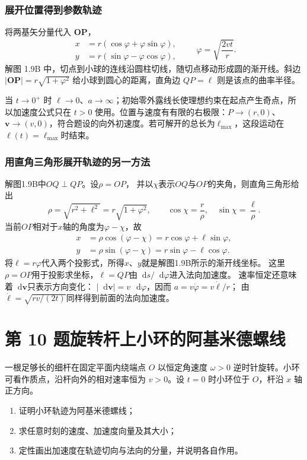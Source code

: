 \documentclass[UTF8,fontset=fandol,a4paper,11pt]{ctexart}
\newcommand{\dd}{\mathop{}\!\mathrm{d}}
\newcommand{\vect}[1]{\bm{#1}}
\newcommand{\tagline}[1]{\noindent{\small\color{muted}#1}\par}
\begin{document}
\subsubsection*{展开位置得到参数轨迹}
将两基矢分量代入 $\vect{OP}$，
\[
\boxed{\begin{aligned}
x&=r(\cos\varphi+\varphi\sin\varphi),\\
y&=r(\sin\varphi-\varphi\cos\varphi),
\end{aligned}\qquad\varphi=\sqrt{\frac{2vt}{r}}}.
\]
解图 1.9B 中，切点到小球的连线沿圆柱切线，随切点移动形成圆的渐开线。斜边 $|\vect{OP}|=r\sqrt{1+\varphi^2}$ 给小球到圆心的距离，直角边 $QP=\ell$ 则是该点的曲率半径。

当 $t\to0^+$ 时 $\ell\to0$、$a\to\infty$；初始零外露线长使理想约束在起点产生奇点，所以加速度公式只在 $t>0$ 使用。位置与速度有有限的右极限：$P\to(r,0)$、$\vect v\to(v,0)$，符合题设的向外初速度。若可解开的总长为$\ell_{\max}$，这段运动在$\ell(t)=\ell_{\max}$时结束。
\subsubsection*{用直角三角形展开轨迹的另一方法}
解图1.9B中$OQ\perp QP$。设$\rho=OP$，
并以$\chi$表示$OQ$与$OP$的夹角，则直角三角形给出
\[
\rho=\sqrt{r^2+\ell^2}=r\sqrt{1+\varphi^2},\qquad
\cos\chi=\frac r\rho,\quad \sin\chi=\frac{\ell}{\rho}.
\]
当前$OP$相对于$x$轴的角度为$\varphi-\chi$，故
\[
\begin{aligned}
x&=\rho\cos(\varphi-\chi)
=r\cos\varphi+\ell\sin\varphi,\\
y&=\rho\sin(\varphi-\chi)
=r\sin\varphi-\ell\cos\varphi.
\end{aligned}
\]
将$\ell=r\varphi$代入两个投影式，所得$x$、$y$就是解图1.9B所示的渐开线坐标。
这里$\rho=OP$用于投影求坐标，$\ell=QP$由$\dd s/\dd\varphi$进入法向加速度。
速率恒定还意味着$\dd\vect v$只表示方向变化：
$|\dd\vect v|=v\,\dd\varphi$，因而
$a=v\dot\varphi=v\dot\ell/r$；
由$\dot\ell=\sqrt{rv/(2t)}$同样得到前面的法向加速度。




\section*{第 10 题\quad 旋转杆上小环的阿基米德螺线}

\tagline{M-01-10}

一根足够长的细杆在固定平面内绕端点 $O$ 以恒定角速度 $\omega>0$ 逆时针旋转。小环可看作质点，沿杆向外的相对速率恒为 $v>0$。设 $t=0$ 时小环位于 $O$，杆沿 $x$ 轴正方向。
\begin{enumerate}
\item 证明小环轨迹为阿基米德螺线；
\item 求任意时刻的速度、加速度向量及其大小；
\item 定性画出加速度在轨迹切向与法向的分量，并说明各自作用。
\end{enumerate}
\end{document}
